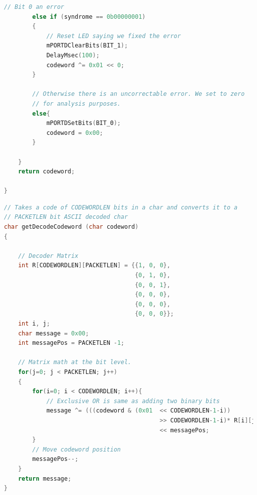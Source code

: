 \documentclass[12pt]{article}
\begin{document}
\begin{lstlisting}[language=c, 
caption=Check Message Integrity using Parity Matrix,
label=lst:hammingerrordetect]
        // Bit 0 an error
        else if (syndrome == 0b00000001)
        {
            // Reset LED saying we fixed the error
            mPORTDClearBits(BIT_1);
            DelayMsec(100);
            codeword ^= 0x01 << 0;
        }

        // Otherwise there is an uncorrectable error. We set to zero
        // for analysis purposes.
        else{
            mPORTDSetBits(BIT_0);
            codeword = 0x00;
        } 

    }
    return codeword;

}
\end{lstlisting}

\begin{lstlisting}[language=c, 
caption=Decode Codeword into 3-Bit Message,
label=lst:decodercoderword]
// Takes a code of CODEWORDLEN bits in a char and converts it to a 
// PACKETLEN bit ASCII decoded char
char getDecodeCodeword (char codeword)
{

    // Decoder Matrix
    int R[CODEWORDLEN][PACKETLEN] = {{1, 0, 0},
                                     {0, 1, 0},
                                     {0, 0, 1},
                                     {0, 0, 0},
                                     {0, 0, 0},
                                     {0, 0, 0}};
    int i, j;
    char message = 0x00;
    int messagePos = PACKETLEN -1;

    // Matrix math at the bit level.
    for(j=0; j < PACKETLEN; j++)
    {
        for(i=0; i < CODEWORDLEN; i++){
            // Exclusive OR is same as adding two binary bits
            message ^= (((codeword & (0x01  << CODEWORDLEN-1-i)) 
                                            >> CODEWORDLEN-1-i)* R[i][j]) 
                                            << messagePos;
        }
        // Move codeword position
        messagePos--;
    }
    return message;
}
\end{lstlisting}
\end{document}
